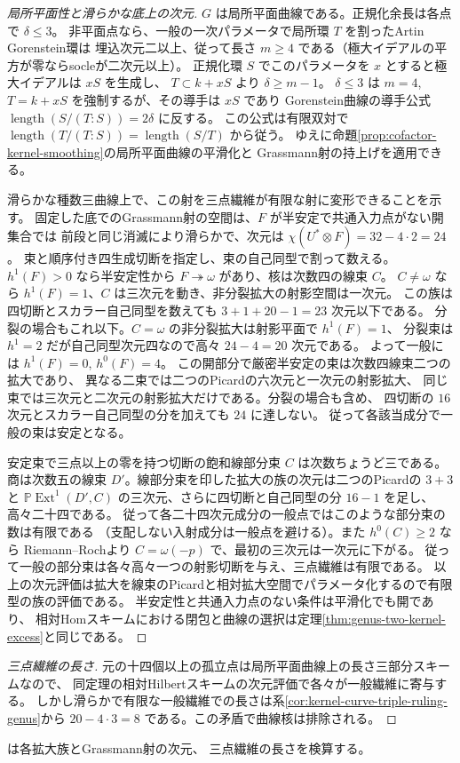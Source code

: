 \begin{proof}[局所平面性と滑らかな底上の次元]
$G$ は局所平面曲線である。正規化余長は各点で $\delta\le3$。
非平面点なら、一般の一次パラメータで局所環 $T$ を割ったArtin Gorenstein環は
埋込次元二以上、従って長さ $m\ge4$ である（極大イデアルの平方が零ならsocleが二次元以上）。
正規化環 $S$ でこのパラメータを $x$ とすると極大イデアルは $xS$ を生成し、
$T\subset k+xS$ より $\delta\ge m-1$。
$\delta\le3$ は $m=4$, $T=k+xS$ を強制するが、その導手は $xS$ であり
Gorenstein曲線の導手公式 $\operatorname{length}(S/(T:S))=2\delta$ に反する。
この公式は有限双対で $\operatorname{length}(T/(T:S))=\operatorname{length}(S/T)$ から従う。
ゆえに命題\ref{prop:cofactor-kernel-smoothing}の局所平面曲線の平滑化と
Grassmann射の持上げを適用できる。

滑らかな種数三曲線上で、この射を三点繊維が有限な射に変形できることを示す。
固定した底でのGrassmann射の空間は、$F$ が半安定で共通入力点がない開集合では
前段と同じ消滅により滑らかで、次元は
$\chi(U^*\otimes F)=32-4\cdot2=24$。
束と順序付き四生成切断を指定し、束の自己同型で割って数える。
$h^1(F)>0$ なら半安定性から $F\twoheadrightarrow\omega$ があり、核は次数四の線束 $C$。
$C\ne\omega$ なら $h^1(F)=1$、$C$ は三次元を動き、非分裂拡大の射影空間は一次元。
この族は四切断とスカラー自己同型を数えても $3+1+20-1=23$ 次元以下である。
分裂の場合もこれ以下。$C=\omega$ の非分裂拡大は射影平面で $h^1(F)=1$、
分裂束は $h^1=2$ だが自己同型次元四なので高々 $24-4=20$ 次元である。
よって一般には $h^1(F)=0$, $h^0(F)=4$。
この開部分で厳密半安定の束は次数四線束二つの拡大であり、
異なる二束では二つのPicardの六次元と一次元の射影拡大、
同じ束では三次元と二次元の射影拡大だけである。分裂の場合も含め、
四切断の $16$ 次元とスカラー自己同型の分を加えても $24$ に達しない。
従って各該当成分で一般の束は安定となる。

安定束で三点以上の零を持つ切断の飽和線部分束 $C$ は次数ちょうど三である。
商は次数五の線束 $D'$。線部分束を印した拡大の族の次元は二つのPicardの $3+3$ と
$\mathbb P\operatorname{Ext}^1(D',C)$ の三次元、さらに四切断と自己同型の分 $16-1$ を足し、
高々二十四である。
従って各二十四次元成分の一般点ではこのような部分束の数は有限である
（支配しない入射成分は一般点を避ける）。また $h^0(C)\ge2$ なら
Riemann--Rochより $C=\omega(-p)$ で、最初の三次元は一次元に下がる。
従って一般の部分束は各々高々一つの射影切断を与え、三点繊維は有限である。
以上の次元評価は拡大を線束のPicardと相対拡大空間でパラメータ化するので有限型の族の評価である。
半安定性と共通入力点のない条件は平滑化でも開であり、
相対Homスキームにおける閉包と曲線の選択は定理\ref{thm:genus-two-kernel-excess}と同じである。
\end{proof}

\begin{proof}[三点繊維の長さ]
元の十四個以上の孤立点は局所平面曲線上の長さ三部分スキームなので、
同定理の相対Hilbertスキームの次元評価で各々が一般繊維に寄与する。
しかし滑らかで有限な一般繊維での長さは系\ref{cor:kernel-curve-triple-ruling-genus}から
$20-4\cdot3=8$ である。この矛盾で曲線核は排除される。
\end{proof}
 は各拡大族とGrassmann射の次元、
三点繊維の長さを検算する。

